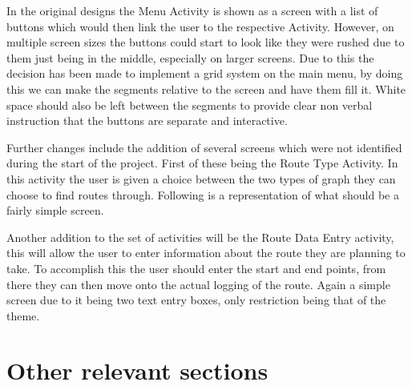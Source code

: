 In the original designs the Menu Activity is shown as a screen with a list of buttons which would then link the user to the respective Activity. However, on multiple screen sizes the buttons could start to look like they were rushed due to them just being in the middle, especially on larger screens. Due to this the decision has been made to implement a grid system on the main menu, by doing this we can make the segments relative to the screen and have them fill it. White space should also be left between the segments to provide clear non verbal instruction that the buttons are separate and interactive. 

Further changes include the addition of several screens which were not identified during the start of the project. First of these being the Route Type Activity. In this activity the user is given a choice between the two types of graph they can choose to find routes through. Following is a representation of what should be a fairly simple screen.

Another addition to the set of activities will be the Route Data Entry activity, this will allow the user to enter information about the route they are planning to take. To accomplish this the user should enter the start and end points, from there they can then move onto the actual logging of the route. Again a simple screen due to it being two text entry boxes, only restriction being that of the theme.
\newpage
\section{Other relevant sections}